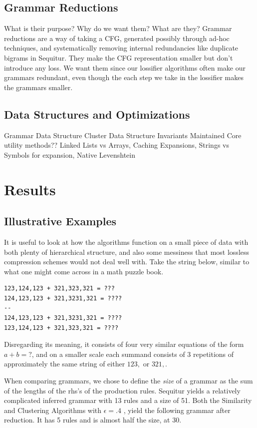 \documentclass[11pt]{article}
\begin{document}
\subsection{Grammar Reductions}
What is their purpose? Why do we want them? What are they?
Grammar reductions are a way of taking a CFG, generated possibly through
ad-hoc techniques, and systematically removing internal redundancies
like duplicate bigrams in Sequitur. They make the CFG representation smaller
but don't introduce any loss. We want them since our lossifier algorithms
often make our grammars redundant, even though the each step we take
in the lossifier makes the grammars smaller.

\subsection{Data Structures and Optimizations}
Grammar Data Structure
Cluster Data Structure
Invariants Maintained
Core utility methods??
Linked Lists vs Arrays, Caching Expansions, Strings vs Symbols for expansion, Native Levenshtein

\section{Results}
\subsection{Illustrative Examples}
It is useful to look at how the algorithms function on a small piece of
data with both plenty of hierarchical structure, and also some messiness
that most lossless compression schemes would not deal well with. Take
the string below, similar to what one might come across in a math
puzzle book.

\begin{verbatim}
123,124,123 + 321,323,321 = ???
124,123,123 + 321,3231,321 = ????
--
124,123,123 + 321,3231,321 = ????
123,124,123 + 321,323,321 = ????
\end{verbatim}

Disregarding its meaning, it consists of four very similar equations of the
form $a + b = ?$, and on a smaller scale each summand consists of
3 repetitions of approximately the same string of either $123,$ or $321,$.

When comparing grammars, we chose to define the \emph{size} of a grammar
as the sum of the lengths of the rhs's of the production rules.
Sequitur yields a relatively complicated inferred grammar with 13 rules and
a size of 51. Both the Similarity and Clustering Algorithms with $\epsilon = .4$
, yield the following grammar after reduction. It has 5 rules and is almost
half the size, at 30.
\end{document}
